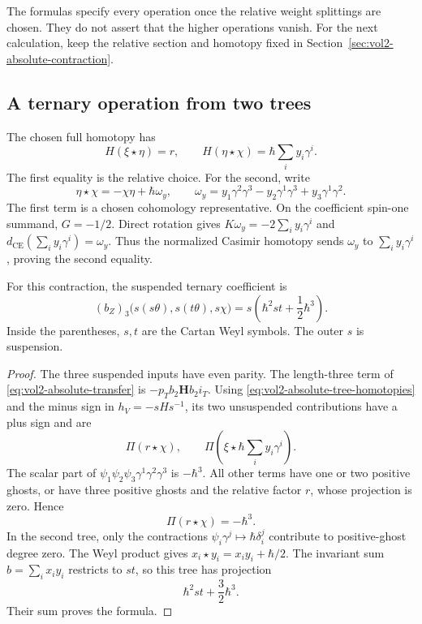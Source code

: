 The formulas specify every operation once the relative weight
splittings are chosen. They do not assert that the higher
operations vanish. For the next calculation, keep the relative
section and homotopy fixed in
Section~\ref{sec:vol2-absolute-contraction}.

\subsection{A ternary operation from two trees}

The chosen full homotopy has
\begin{equation}\label{eq:vol2-absolute-tree-homotopies}
 H(\xi\star\eta)=r,
 \qquad
 H(\eta\star\chi)=\hbar\sum_i y_i\gamma^i.
\end{equation}
The first equality is the relative choice.
For the second, write
\[
 \eta\star\chi=-\chi\eta+\hbar\omega_y,
 \qquad
 \omega_y=y_1\gamma^2\gamma^3
          -y_2\gamma^1\gamma^3+y_3\gamma^1\gamma^2.
\]
The first term is a chosen cohomology representative.
On the coefficient spin-one summand,
$G=-1/2$. Direct rotation gives
$K\omega_y=-2\sum_i y_i\gamma^i$ and
$d_{\mathrm{CE}}(\sum_i y_i\gamma^i)=\omega_y$.
Thus the normalized Casimir homotopy sends $\omega_y$ to
$\sum_i y_i\gamma^i$, proving the second equality.

\begin{proposition}\label{prop:vol2-absolute-ternary}
For this contraction, the suspended ternary coefficient is
\begin{equation}\label{eq:vol2-absolute-ternary}
 (b_Z)_3\bigl(s(s\theta),s(t\theta),s\chi\bigr)
     =s\left(\hbar^2st+\frac12\hbar^3\right).
\end{equation}
Inside the parentheses, $s,t$ are the Cartan Weyl symbols.
The outer $s$ is suspension.
\end{proposition}

\begin{proof}
The three suspended inputs have even parity.
The length-three term of \eqref{eq:vol2-absolute-transfer}
is $-p_Tb_2\mathbf H b_2i_T$.
Using \eqref{eq:vol2-absolute-tree-homotopies} and the minus
sign in $h_V=-sHs^{-1}$, its two unsuspended contributions
have a plus sign and are
\[
 \Pi(r\star\chi),\qquad
 \Pi\left(\xi\star\hbar\sum_i y_i\gamma^i\right).
\]
The scalar part of
$\psi_1\psi_2\psi_3\gamma^1\gamma^2\gamma^3$
is $-\hbar^3$. All other terms have one or two positive
ghosts, or have three positive ghosts and the relative factor
$r$, whose projection is zero. Hence
\[
 \Pi(r\star\chi)=-\hbar^3.
\]
In the second tree, only the contractions
$\psi_i\gamma^j\mapsto\hbar\delta_i^j$
contribute to positive-ghost degree zero.
The Weyl product gives
$x_i\star y_i=x_iy_i+\hbar/2$.
The invariant sum $b=\sum_i x_iy_i$ restricts to $st$,
so this tree has projection
\[
 \hbar^2st+\frac32\hbar^3.
\]
Their sum proves the formula.
\end{proof}

